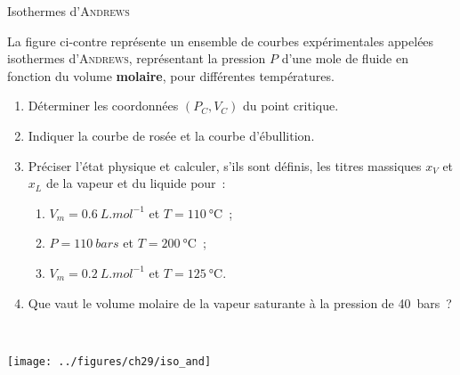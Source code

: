 \documentclass[a4paper, 11pt, final, garamond]{book}
\begin{document}
\begin{NCexem}{Isothermes d'\textsc{Andrews}}
  \begin{minipage}[t]{.60\linewidth}
    La figure ci-contre représente un ensemble de courbes expérimentales
    appelées isothermes d'\textsc{Andrews}, représentant la pression $P$ d'une
    mole de fluide en fonction du volume \textbf{molaire}, pour différentes
    températures. \smallbreak
    \begin{enumerate}
      \item Déterminer les coordonnées $(P_C,V_C)$ du point critique.
      \item Indiquer la courbe de rosée et la courbe d'ébullition.
      \item Préciser l'état physique et calculer, s'ils sont définis, les titres
        massiques $x_V$ et $x_L$ de la vapeur et du liquide pour~:
        \begin{enumerate}
          \item $V_m = \SI{0.6}{L.mol^{-1}}$ et $T = \SI{110}{\degreeCelsius}$~;
          \item $P = \SI{110}{bars}$ et $T = \SI{200}{\degreeCelsius}$~;
          \item $V_m = \SI{0.2}{L.mol^{-1}}$ et $T = \SI{125}{\degreeCelsius}$.
        \end{enumerate}
      \item Que vaut le volume molaire de la vapeur saturante à la
        pression de \SI{40}{bars}~?
    \end{enumerate}
  \end{minipage}
  \begin{minipage}[t]{.40\linewidth}
    ~
    \vspace*{-10pt}
    \begin{center}
      \texttt{[image: ../figures/ch29/iso\_and]}
      \label{fig:isoand}
    \end{center}
  \end{minipage}
\end{NCexem}
\end{document}
